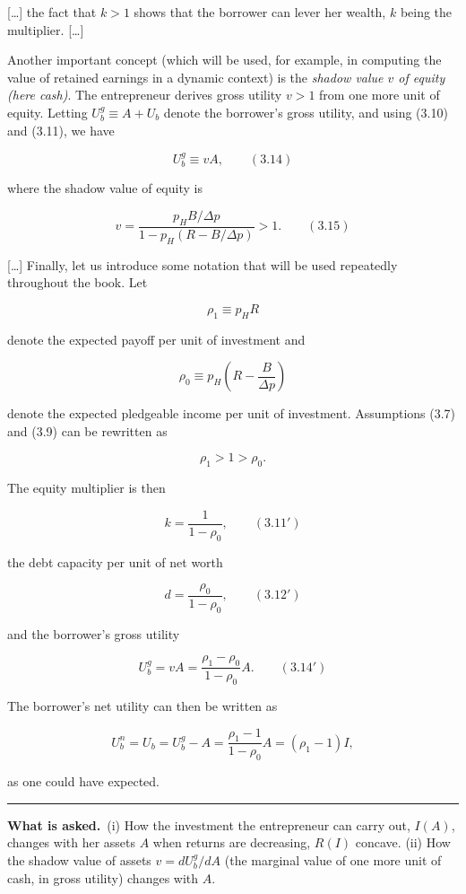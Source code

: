 \documentclass[11pt,a4paper]{article}
\newcommand{\asked}{\par\medskip\noindent\textbf{What is asked.}~}
\newcommand{\stmtend}{\par\endgroup\nopagebreak\noindent\rule{\linewidth}{0.4pt}\par\medskip}
\begin{document}
{[}\ldots{]} the fact that \(k > 1\) shows that the borrower can lever her wealth, \(k\) being the
multiplier. {[}\ldots{]}

Another important concept (which will be used, for example, in computing the value of retained
earnings in a dynamic context) is the \emph{shadow value \(v\) of equity (here cash)}. The
entrepreneur derives gross utility \(v > 1\) from one more unit of equity. Letting
\(U_b^g \equiv A + U_b\) denote the borrower's gross utility, and using (3.10) and (3.11), we have

\[U_b^g \equiv vA, \qquad (3.14)\]

where the shadow value of equity is

\[v = \frac{p_H B/\Delta p}{1 - p_H(R - B/\Delta p)} > 1. \qquad (3.15)\]

{[}\ldots{]} Finally, let us introduce some notation that will be used repeatedly throughout the
book. Let

\[\rho_1 \equiv p_H R\]

denote the expected payoff per unit of investment and

\[\rho_0 \equiv p_H\left(R - \frac{B}{\Delta p}\right)\]

denote the expected pledgeable income per unit of investment. Assumptions (3.7) and (3.9) can be
rewritten as

\[\rho_1 > 1 > \rho_0.\]

The equity multiplier is then

\[k = \frac{1}{1 - \rho_0}, \qquad (3.11')\]

the debt capacity per unit of net worth

\[d = \frac{\rho_0}{1 - \rho_0}, \qquad (3.12')\]

and the borrower's gross utility

\[U_b^g = vA = \frac{\rho_1 - \rho_0}{1 - \rho_0} A. \qquad (3.14')\]

The borrower's net utility can then be written as

\[U_b^n = U_b = U_b^g - A = \frac{\rho_1 - 1}{1 - \rho_0} A = (\rho_1 - 1) I,\]

as one could have expected.
\stmtend

\asked (i) How the investment the entrepreneur can carry out, $I(A)$, changes with her assets
$A$ when returns are decreasing, $R(I)$ concave. (ii) How the shadow value of assets
$v=dU_b^g/dA$ (the marginal value of one more unit of cash, in gross utility) changes with $A$.
\end{document}
